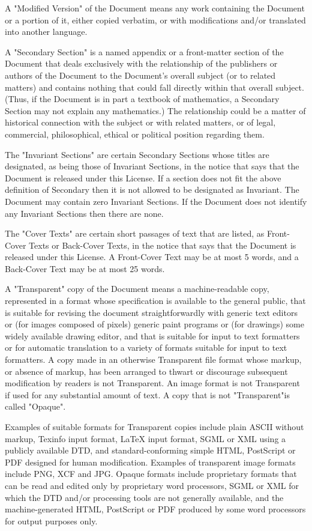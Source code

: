 A "Modified Version" of the Document means any work containing the Document or a portion of it, either copied verbatim, 
or with modifications and/or translated into another language.

A "Secondary Section" is a named appendix or a front-matter section of the Document that deals exclusively with the 
relationship of the publishers or authors of the Document to the Document's overall subject (or to related matters) 
and contains nothing that could fall directly within that overall subject. (Thus, if the Document is in part a 
textbook of mathematics, a Secondary Section may not explain any mathematics.) The relationship could be a matter of 
historical connection with the subject or with related matters, or of legal, commercial, philosophical, ethical or 
political position regarding them.

The "Invariant Sections" are certain Secondary Sections whose titles are designated, as being those of Invariant 
Sections, in the notice that says that the Document is released under this License. If a section does not fit 
the above definition of Secondary then it is not allowed to be designated as Invariant. The Document may contain 
zero Invariant Sections. If the Document does not identify any Invariant Sections then there are none.

The "Cover Texts" are certain short passages of text that are listed, as Front-Cover Texts or Back-Cover 
Texts, in the notice that says that the Document is released under this License. A Front-Cover Text may 
be at most 5 words, and a Back-Cover Text may be at most 25 words.

A "Transparent" copy of the Document means a machine-readable copy, represented in a format whose specification 
is available to the general public, that is suitable for revising the document straightforwardly with generic 
text editors or (for images composed of pixels) generic paint programs or (for drawings) some widely available 
drawing editor, and that is suitable for input to text formatters or for automatic translation to a variety of 
formats suitable for input to text formatters. A copy made in an otherwise Transparent file format whose markup, 
or absence of markup, has been arranged to thwart or discourage subsequent modification by readers is not Transparent. 
An image format is not Transparent if used for any substantial amount of text. A copy that is not "Transparent"is called "Opaque".

Examples of suitable formats for Transparent copies include plain ASCII without markup, Texinfo input format, 
LaTeX input format, SGML or XML using a publicly available DTD, and standard-conforming simple HTML, PostScript or 
PDF designed for human modification. Examples of transparent image formats include PNG, XCF and JPG. Opaque formats 
include proprietary formats that can be read and edited only by proprietary word processors, SGML or XML for which the 
DTD and/or processing tools are not generally available, and the machine-generated HTML, PostScript or PDF produced 
by some word processors for output purposes only.

